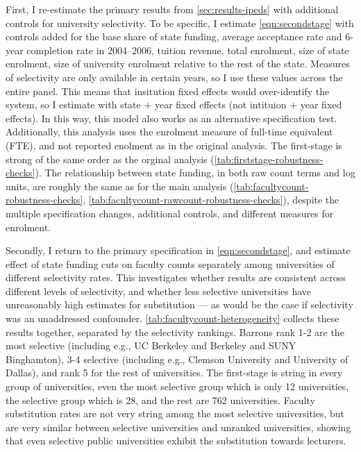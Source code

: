 First, I re-estimate the primary results from \autoref{sec:results-ipeds} with additional controls for university selectivity.
To be specific, I estimate \autoref{eqn:secondstage} with controls added for the base share of state funding, average acceptance rate and 6-year completion rate  in 2004--2006, tuition revenue, total enrolment, size of state enrolment, size of university enrolment relative to the rest of the state.
Measures of selectivity are only available in certain years, so I use these values across the entire panel.
This means that insitution fixed effects would over-identify the system, so I estimate with state $+$ year fixed effects (not intituion $+$ year fixed effects).
In this way, this model also works as an alternative specification test.
Additionally, this analysis uses the enrolment measure of full-time equivalent (FTE), and not reported enolment as in the original analysis.
The first-stage is strong of the same order as the orginal analysis (\autoref{tab:firststage-robustness-checks}).
The relationship between state funding, in both raw count terms and log units, are roughly the same as for the main analysis (\autoref{tab:facultycount-robustness-checks}, \ref{tab:facultycount-rawcount-robustness-checks}), despite the multiple specification changes, additional controls, and different measures for enrolment.

Secondly, I return to the primary specification in \autoref{eqn:secondstage}, and estimate effect of state funding cuts on faculty counts separately among universities of different selectivity rates.
This investigates whether results are consistent across different levels of selectivity, and whether less selective universities have unreasonably high estimates for substitution --- as would be the case if selectivity was an unaddressed confounder.
\autoref{tab:facultycount-heterogeneity} collects these results together, separated by the \cite{barrons2009} selectivity rankings.
Barrons rank 1-2 are the most selective (including e.g., UC Berkeley and  Berkeley and SUNY Binghamton), 3-4 selective (including e.g., Clemson University and University of Dallas), and rank 5 for the rest of universities.
The first-stage is string in every group of universities, even the most selective group which is only 12 universities, the selective group which is 28, and the rest are 762 universities.
Faculty substitution rates are not very string among the most selective universities, but are very similar between selective universities and unranked universities, showing that even selective public universities exhibit the substitution towards lecturers.

